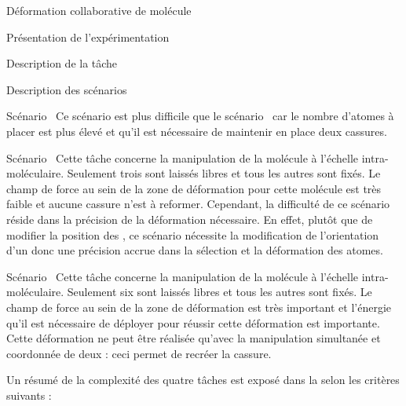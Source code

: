\documentclass[myfrancais,ngerman,english,frenchb]{mythesis}
\begin{document}
\begin{mychapter}{Déformation collaborative de molécule}
\begin{mysection}{Présentation de l'expérimentation}
\begin{mysubsection}{Description de la tâche}
\begin{mysubsubsection}{Description des scénarios}
\begin{myparagraph}{Scénario~}
						Ce scénario est plus difficile que le scénario~ car le nombre d'atomes à placer est plus élevé et qu'il est nécessaire de maintenir en place deux cassures.
					\end{myparagraph}
					\begin{myparagraph}{Scénario~}
						Cette tâche concerne la manipulation de la molécule \myTRPZIPPER à l'échelle intra-moléculaire.
						Seulement trois  sont laissés libres et tous les autres  sont fixés.
						Le champ de force au sein de la zone de déformation pour cette molécule est très faible et aucune cassure n'est à reformer.
						Cependant, la difficulté de ce scénario réside dans la précision de la déformation nécessaire.
						En effet, plutôt que de modifier la position des , ce scénario nécessite la modification de l'orientation d'un  donc une précision accrue dans la sélection et la déformation des atomes.
					\end{myparagraph}
					\begin{myparagraph}{Scénario~}
						Cette tâche concerne la manipulation de la molécule \myTRPCAGE à l'échelle intra-moléculaire.
						Seulement six  sont laissés libres et tous les autres  sont fixés.
						Le champ de force au sein de la zone de déformation est très important et l'énergie qu'il est nécessaire de déployer pour réussir cette déformation est importante.
						Cette déformation ne peut être réalisée qu'avec la manipulation simultanée et coordonnée de deux  : ceci permet de recréer la cassure.
					\end{myparagraph}

					Un résumé de la complexité des quatre tâches est exposé dans la  selon les critères suivants :


\end{mysubsubsection}
\end{mysubsection}
\end{mysection}
\end{mychapter}
\end{document}
